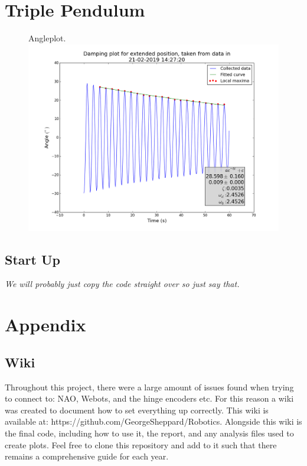 \documentclass[11pt]{article}
\newcommand*\ruleline[1]{\par\noindent\raisebox{.8ex}{\makebox[\linewidth]{\hrulefill\hspace{1ex}\raisebox{-.8ex}{#1}\hspace{1ex}\hrulefill}}}
\begin{document}
\section{Triple Pendulum}

    \begin{figure}[!htb]
        \centering
        \captionbox
             {Angleplot.\label{angleplot}}
             {\includegraphics[width=1.0\textwidth]{ExtendedPositionDamping.png}}
    \end{figure}

\subsection{Start Up}
\textit{We will probably just copy the code straight over so just say that.}


\appendix
\section{Appendix}
\subsection{Wiki} \label{sec:wiki}
\ruleline{George Sheppard}
Throughout this project, there were a large amount of issues found when trying to connect to: NAO, Webots, and the hinge encoders etc. For this reason a wiki was created to document how to set everything up correctly. This wiki is available at: https://github.com/GeorgeSheppard/Robotics. Alongside this wiki is the final code, including how to use it, the report, and any analysis files used to create plots. Feel free to clone this repository and add to it such that there remains a comprehensive guide for each year.
\end{document}

